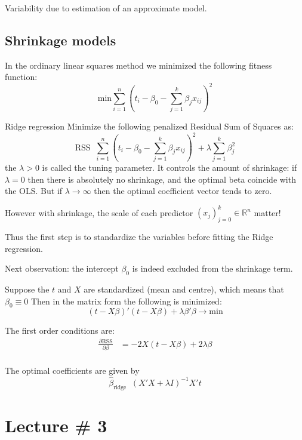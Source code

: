 \documentclass[a4paper]{article}
\newcommand{\brac}[1]{{\left ( #1 \right )}}
\newcommand{\Real}{\mathbb{R}}
\newcommand{\RSS}{{\text{RSS}}}
\newcommand{\defn}{\mathop{\overset{\Delta}{=}}\nolimits}
\begin{document}
Variability due to estimation of an approximate model.

\subsection{Shrinkage models} %
\label{sub:shrinkage_models}

In the ordinary linear squares method we minimized the following fitness function:
\[\text{min} \sum_{i=1}^n \brac{t_i - \beta_0 - \sum_{j=1}^k \beta_j x_{ij}}^2\]

Ridge regression
Minimize the following penalized Residual Sum of Squares as:
\[\RSS\defn \sum_{i=1}^n \brac{t_i - \beta_0 - \sum_{j=1}^k \beta_j x_{ij}}^2 + \lambda \sum_{j=1}^k \beta_j^2\]
the $\lambda>0$ is called the tuning parameter.
It controls the amount of shrinkage:
if $\lambda = 0$ then there is absolutely no shrinkage, and the optimal beta coincide with the OLS.
But if $\lambda\to \infty$ then the optimal coefficient vector tends to zero. 

However with shrinkage, the scale of each predictor $\brac{x_j}_{j=0}^k\in \Real^n$ matter!

Thus the first step is to standardize the variables before fitting the Ridge regression.

Next observation: the intercept $\beta_0$ is indeed excluded from the shrinkage term.

Suppose the $t$ and $X$ are standardized (mean and centre), which means that $\beta_0 \equiv 0$
Then in the matrix form the following is minimized:
\[\brac{t-X\beta}'\brac{t- X\beta} + \lambda \beta'\beta \to \text{min}\]

The first order conditions are:
\begin{align*}
	\frac{\partial \RSS}{\partial \beta } &= -2 X\brac{t-X\beta}+2\lambda \beta\\
\end{align*}

The optimal coefficients are given by
\[\hat{\beta}_\text{ridge}\defn \brac{X'X + \lambda I}^{-1}X't\]




\section{Lecture \# 3} %
\label{sec:lecture_3}
\end{document}
